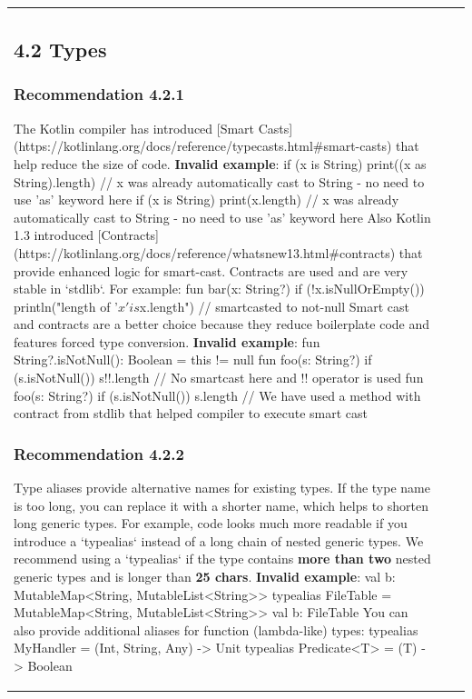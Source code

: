 \begin{center}
\begin{tabular}{ |p{}|p{}|p{}| }
{{{{{\subsection*{\textbf{4.2 Types}}
\subsubsection*{\textbf{Recommendation 4.2.1}}
The Kotlin compiler has introduced [Smart Casts](https://kotlinlang.org/docs/reference/typecasts.html\#smart-casts) that help reduce the size of code.
\textbf{Invalid example}:
    if (x is String) {
        print((x as String).length) // x was already automatically cast to String - no need to use 'as' keyword here
    }
    if (x is String) {
        print(x.length) // x was already automatically cast to String - no need to use 'as' keyword here
    }
Also Kotlin 1.3 introduced [Contracts](https://kotlinlang.org/docs/reference/whatsnew13.html\#contracts) that provide enhanced logic for smart-cast.
Contracts are used and are very stable in `stdlib`.
For example:
fun bar(x: String?) {
    if (!x.isNullOrEmpty()) {
        println("length of '$x' is ${x.length}") // smartcasted to not-null
    }
}
Smart cast and contracts are a better choice because they reduce boilerplate code and features forced type conversion.
\textbf{Invalid example}:
fun String?.isNotNull(): Boolean = this != null
fun foo(s: String?) {
    if (s.isNotNull()) s!!.length // No smartcast here and !! operator is used
}
fun foo(s: String?) {
    if (s.isNotNull()) s.length // We have used a method with contract from stdlib that helped compiler to execute smart cast
}
\subsubsection*{\textbf{Recommendation 4.2.2}}
Type aliases provide alternative names for existing types.
If the type name is too long, you can replace it with a shorter name, which helps to shorten long generic types.
For example, code looks much more readable if you introduce a `typealias` instead of a long chain of nested generic types.
We recommend using a `typealias` if the type contains \textbf{more than two} nested generic types and is longer than \textbf{25 chars}.
\textbf{Invalid example}:
val b: MutableMap<String, MutableList<String>>
typealias FileTable = MutableMap<String, MutableList<String>>
val b: FileTable
You can also provide additional aliases for function (lambda-like) types:
typealias MyHandler = (Int, String, Any) -> Unit
typealias Predicate<T> = (T) -> Boolean
}}}}}
\end{tabular}
\end{center}

